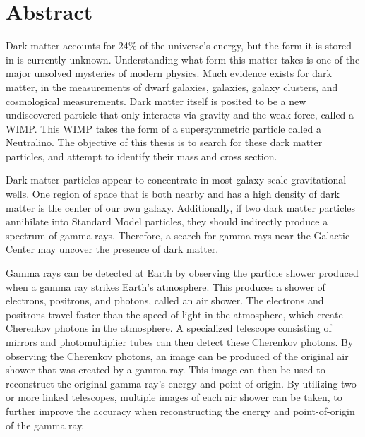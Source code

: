 \cleartooddpage[\thispagestyle{empty}]
\section*{Abstract}

Dark matter accounts for 24\% of the universe's energy, but the form it is stored in is currently unknown.
Understanding what form this matter takes is one of the major unsolved mysteries of modern physics.
Much evidence exists for dark matter, in the measurements of dwarf galaxies, galaxies, galaxy clusters, and cosmological measurements.
Dark matter itself is posited to be a new undiscovered particle that only interacts via gravity and the weak force, called a WIMP.
This WIMP takes the form of a supersymmetric particle called a Neutralino.
The objective of this thesis is to search for these dark matter particles, and attempt to identify their mass and cross section.

Dark matter particles appear to concentrate in most galaxy-scale gravitational wells.
One region of space that is both nearby and has a high density of dark matter is the center of our own galaxy.
Additionally, if two dark matter particles annihilate into Standard Model particles, they should indirectly produce a spectrum of gamma rays.
Therefore, a search for gamma rays near the Galactic Center may uncover the presence of dark matter.

Gamma rays can be detected at Earth by observing the particle shower produced when a gamma ray strikes Earth's atmosphere.
This produces a shower of electrons, positrons, and photons, called an air shower.
The electrons and positrons travel faster than the speed of light in the atmosphere, which create Cherenkov photons in the atmosphere.
A specialized telescope consisting of mirrors and photomultiplier tubes can then detect these Cherenkov photons.
By observing the Cherenkov photons, an image can be produced of the original air shower that was created by a gamma ray.
This image can then be used to reconstruct the original gamma-ray's energy and point-of-origin.
By utilizing two or more linked telescopes, multiple images of each air shower can be taken, to further improve the accuracy when reconstructing the energy and point-of-origin of the gamma ray.

